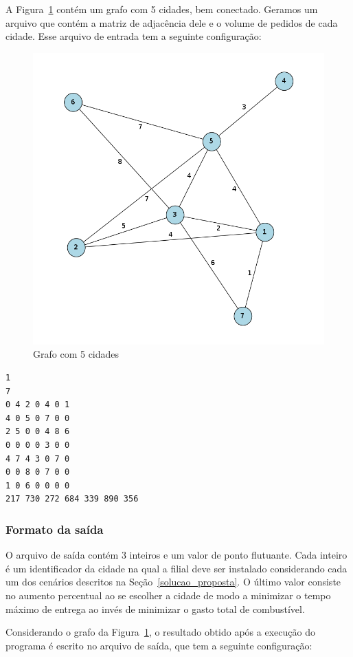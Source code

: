 \documentclass[12pt]{article}
\begin{document}
A Figura~\ref{grafo} contém um grafo com 5 cidades, bem conectado. Geramos um arquivo que contém a matriz de adjacência dele e o volume de pedidos de cada cidade. Esse arquivo de entrada tem a seguinte configuração:

\begin{figure}[h!]
	\centering
	\includegraphics[width=.8\textwidth]{graph_teste.png}
	\caption{Grafo com 5 cidades}
	\label{grafo}
\end{figure}


\begin{verbatim}
1
7
0 4 2 0 4 0 1
4 0 5 0 7 0 0
2 5 0 0 4 8 6
0 0 0 0 3 0 0
4 7 4 3 0 7 0
0 0 8 0 7 0 0
1 0 6 0 0 0 0
217 730 272 684 339 890 356
\end{verbatim}

\subsubsection{Formato da saída}

O arquivo de saída contém 3 inteiros e um valor de ponto flutuante. Cada inteiro é um identificador da cidade na qual a filial deve ser instalado considerando cada um dos cenários descritos na Seção~\ref{solucao_proposta}. O último valor consiste no aumento percentual ao se escolher a cidade de modo a minimizar o tempo máximo de entrega ao invés de minimizar o gasto total de combustível.

Considerando o grafo da Figura~\ref{grafo}, o resultado obtido após a execução do programa é escrito no arquivo de saída, que tem a seguinte configuração:
\end{document}
